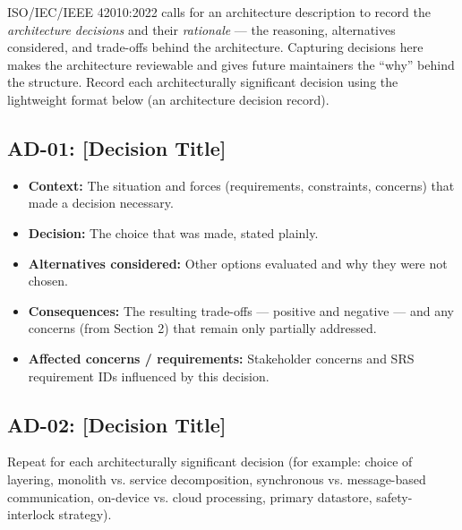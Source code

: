 ISO/IEC/IEEE 42010:2022 \cite{ISO42010} calls for an architecture description to record the \textit{architecture decisions} and their \textit{rationale} --- the reasoning, alternatives considered, and trade-offs behind the architecture. Capturing decisions here makes the architecture reviewable and gives future maintainers the ``why'' behind the structure. Record each architecturally significant decision using the lightweight format below (an architecture decision record).

\subsection{AD-01: [Decision Title]}
\begin{itemize}
  \item \textbf{Context:} The situation and forces (requirements, constraints, concerns) that made a decision necessary.
  \item \textbf{Decision:} The choice that was made, stated plainly.
  \item \textbf{Alternatives considered:} Other options evaluated and why they were not chosen.
  \item \textbf{Consequences:} The resulting trade-offs --- positive and negative --- and any concerns (from Section 2) that remain only partially addressed.
  \item \textbf{Affected concerns / requirements:} Stakeholder concerns and SRS requirement IDs influenced by this decision.
\end{itemize}

\subsection{AD-02: [Decision Title]}
Repeat for each architecturally significant decision (for example: choice of layering, monolith vs. service decomposition, synchronous vs. message-based communication, on-device vs. cloud processing, primary datastore, safety-interlock strategy).
